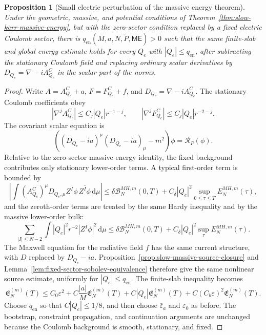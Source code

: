 \documentclass[11pt]{article}
\numberwithin{equation}{section}
\theoremstyle{plain}
\newtheorem{proposition}[theorem]{Proposition}
\theoremstyle{definition}
\theoremstyle{remark}
\newcommand{\dd}{\mathrm{d}}
\newcommand{\ME}{\mathsf{ME}}
\begin{document}
\begin{proposition}[Small electric perturbation of the massive energy theorem]\label{prop:slow-electric-energy-perturbation}
Under the geometric, massive, and potential conditions of Theorem~\ref{thm:slow-kerr-massive-energy}, but with the zero-sector condition replaced by a fixed electric Coulomb sector, there is \(q_{\mathrm{en}}(M,a,N,\widetilde P,\ME)>0\) such that the same finite-slab and global energy estimate holds for every \(Q_e\) with \(|Q_e|\le q_{\mathrm{en}}\), after subtracting the stationary Coulomb field and replacing ordinary scalar derivatives by \(D_{Q_e}=\nabla-iA^C_{Q_e}\) in the scalar part of the norms.
\end{proposition}

\begin{proof}
Write \(A=A^C_{Q_e}+a\), \(F=F^C_{Q_e}+f\), and \(D_{Q_e}=\nabla-iA^C_{Q_e}\).  The stationary Coulomb coefficients obey
\begin{equation}
 |\nabla^jA^C_{Q_e}|\le C_j|Q_e|r^{-1-j},
 \qquad
 |\nabla^jF^C_{Q_e}|\le C_j|Q_e|r^{-2-j}.
\end{equation}
The covariant scalar equation is
\begin{equation}
 \left((D_{Q_e}-ia)^\mu(D_{Q_e}-ia)_\mu-m^2\right)\phi=\mathcal R_P(\phi).
\end{equation}
Relative to the zero-sector massive energy identity, the fixed background contributes only stationary lower-order terms.  A typical first-order term is bounded by
\begin{equation}
 \left|\int (A^C_{Q_e})^\mu D_{Q_e,\mu}Z^I\phi\, \overline{Z^I\phi}\,\dd\mu\right|
 \le \delta\mathcal B_N^{MH,m}(0,T)
 +C_\delta |Q_e|^2\sup_{0\le\tau\le T}E_N^{MH,m}(\tau),
\end{equation}
and the zeroth-order terms are treated by the same Hardy inequality and by the massive lower-order bulk:
\begin{equation}
\sum_{|I|\le N-2}\int |Q_e|^2r^{-2}|Z^I\phi|^2\,\dd\mu
\le \delta\mathcal B_N^{MH,m}(0,T)+C_\delta |Q_e|^2\sup_\tau E_N^{MH,m}(\tau).
\end{equation}
The Maxwell equation for the radiative field \(f\) has the same current structure, with \(D\) replaced by \(D_{Q_e}-ia\).  Proposition~\ref{prop:slow-massive-source-closure} and Lemma~\ref{lem:fixed-sector-sobolev-equivalence} therefore give the same nonlinear source estimate, uniformly for \(|Q_e|\le q_{\mathrm{en}}\).  The finite-slab inequality becomes
\begin{equation}
\mathfrak E_N^{(m)}(T)
\le C_0\varepsilon^2
+C\frac{|a|}{M}\mathfrak E_N^{(m)}(T)
+C|Q_e|\mathfrak E_N^{(m)}(T)
+C(C_b\varepsilon)^2\mathfrak E_N^{(m)}(T).
\end{equation}
Choose \(q_{\mathrm{en}}\) so that \(C|Q_e|\le1/8\), and then choose \(\bar\varepsilon_a\) and \(\varepsilon_0\) as before.  The bootstrap, constraint propagation, and continuation arguments are unchanged because the Coulomb background is smooth, stationary, and fixed.
\end{proof}
\end{document}

